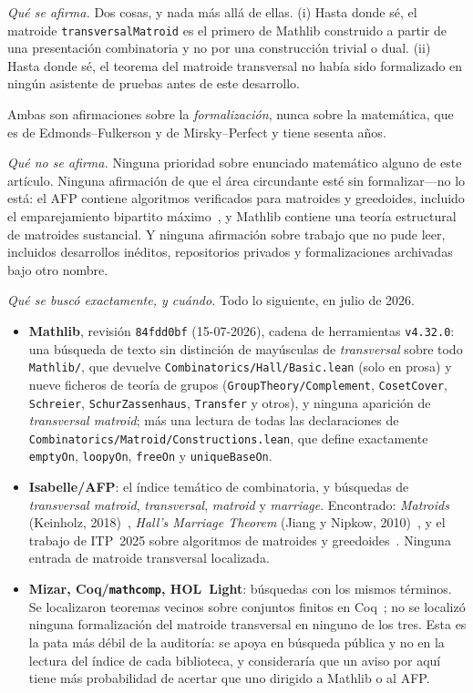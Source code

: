 \documentclass[11pt]{article}
\newcommand{\lean}[1]{\texttt{#1}}
\begin{document}
{\sloppy\emph{Qué se afirma.} Dos cosas, y nada más allá de ellas. (i) Hasta donde sé, el matroide
\lean{transversalMatroid} es el primero de Mathlib construido a partir de una presentación
combinatoria y no por una construcción trivial o dual. (ii) Hasta donde sé, el teorema del matroide
transversal no había sido formalizado en ningún asistente de pruebas antes de este
desarrollo.\par} Ambas son afirmaciones sobre la \emph{formalización}, nunca sobre la matemática,
que es de Edmonds--Fulkerson y de Mirsky--Perfect y tiene sesenta años.

\emph{Qué no se afirma.} Ninguna prioridad sobre enunciado matemático alguno de este artículo.
Ninguna afirmación de que el área circundante esté sin formalizar---no lo está: el AFP contiene
algoritmos verificados para matroides y greedoides, incluido el emparejamiento bipartito
máximo~\cite{itp2025}, y Mathlib contiene una teoría estructural de matroides sustancial. Y ninguna
afirmación sobre trabajo que no pude leer, incluidos desarrollos inéditos, repositorios privados y
formalizaciones archivadas bajo otro nombre.

\emph{Qué se buscó exactamente, y cuándo.} Todo lo siguiente, en julio de 2026.

\begin{itemize}\itemsep2pt
\item \textbf{Mathlib}, revisión \lean{84fdd0bf} (15-07-2026), cadena de herramientas
\lean{v4.32.0}: una búsqueda de texto sin distinción de mayúsculas de \emph{transversal} sobre todo
\lean{Mathlib/}, que devuelve \lean{Combinatorics/Hall/Basic.lean} (solo en prosa) y nueve ficheros
de teoría de grupos (\lean{GroupTheory/Complement}, \lean{CosetCover}, \lean{Schreier},
\lean{SchurZassenhaus}, \lean{Transfer} y otros), y ninguna aparición de \emph{transversal matroid};
más una lectura de todas las declaraciones de \lean{Combinatorics/Matroid/Constructions.lean}, que
define exactamente \lean{emptyOn}, \lean{loopyOn}, \lean{freeOn} y \lean{uniqueBaseOn}.
\item \textbf{Isabelle/AFP}: el índice temático de combinatoria, y búsquedas de \emph{transversal
matroid}, \emph{transversal}, \emph{matroid} y \emph{marriage}. Encontrado: \emph{Matroids}
(Keinholz, 2018)~\cite{afpmatroids}, \emph{Hall's Marriage Theorem} (Jiang y Nipkow,
2010)~\cite{afphall}, y el trabajo de ITP~2025 sobre algoritmos de matroides y
greedoides~\cite{itp2025}. Ninguna entrada de matroide transversal localizada.
\item \textbf{Mizar, Coq/\lean{mathcomp}, HOL~Light}: búsquedas con los mismos términos. Se
localizaron teoremas vecinos sobre conjuntos finitos en Coq~\cite{coqdilworth}; no se localizó
ninguna formalización del matroide transversal en ninguno de los tres. Esta es la pata más débil de
la auditoría: se apoya en búsqueda pública y no en la lectura del índice de cada biblioteca, y
consideraría que un aviso por aquí tiene más probabilidad de acertar que uno dirigido a Mathlib o
al AFP.
\end{itemize}
\end{document}

